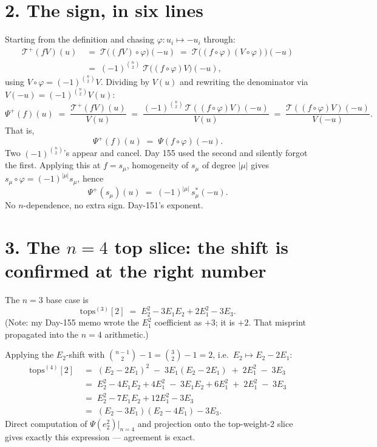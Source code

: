 \documentclass[11pt,a4paper]{article}
\newcommand{\Psip}{\Psi^{+}}
\newcommand{\Ts}{\mathcal{T}}
\newcommand{\Tp}{\mathcal{T}^{+}}
\begin{document}
\section*{2. The sign, in six lines}

Starting from the definition and chasing $\varphi\colon u_i\mapsto -u_i$ through:
\begin{align*}
\Tp(fV)(u) &\;=\; \Ts\!\bigl((fV)\circ\varphi\bigr)(-u)
  \;=\; \Ts\!\bigl((f\circ\varphi)(V\circ\varphi)\bigr)(-u)\\
&\;=\; (-1)^{\binom{n}{2}}\;\Ts\!\bigl((f\circ\varphi)V\bigr)(-u),
\end{align*}
using $V\circ\varphi = (-1)^{\binom{n}{2}} V$. Dividing by $V(u)$ and rewriting
the denominator via $V(-u) = (-1)^{\binom{n}{2}} V(u)$:
\[
\Psip(f)(u) \;=\; \frac{\Tp(fV)(u)}{V(u)}
\;=\;
\frac{(-1)^{\binom{n}{2}}\,\Ts((f\circ\varphi)V)(-u)}{V(u)}
\;=\;
\frac{\Ts((f\circ\varphi)V)(-u)}{V(-u)}.
\]
That is,
\[
\boxed{\ \Psip(f)(u) \;=\; \Psi(f\circ\varphi)(-u).\ }
\]
Two $(-1)^{\binom{n}{2}}$'s appear and cancel. Day 155 used the second and
silently forgot the first. Applying this at $f = s_\mu$, homogeneity of $s_\mu$
of degree $|\mu|$ gives $s_\mu\circ\varphi = (-1)^{|\mu|} s_\mu$, hence
\[
\Psip(s_\mu)(u) \;=\; (-1)^{|\mu|}\,s^*_\mu(-u).
\]
No $n$-dependence, no extra sign. Day-151's exponent.

\section*{3. The $n=4$ top slice: the shift is confirmed at the right number}

The $n=3$ base case is
\[
\mathrm{tops}^{(3)}[2] \;=\; E_2^2 - 3E_1E_2 + 2E_1^2 - 3E_3.
\]
(Note: my Day-155 memo wrote the $E_1^2$ coefficient as $+3$; it is $+2$. That
misprint propagated into the $n=4$ arithmetic.)

Applying the $E_2$-shift with $\binom{n-1}{2}-1 = \binom{3}{2}-1 = 2$, i.e.\
$E_2 \mapsto E_2 - 2E_1$:
\begin{align*}
\mathrm{tops}^{(4)}[2]
&\;=\; (E_2 - 2E_1)^2 \;-\; 3E_1(E_2 - 2E_1) \;+\; 2E_1^2 \;-\; 3E_3\\
&\;=\; E_2^2 - 4E_1E_2 + 4E_1^2 \;-\; 3E_1E_2 + 6E_1^2 \;+\; 2E_1^2 \;-\; 3E_3\\
&\;=\; E_2^2 - 7E_1E_2 + 12E_1^2 - 3E_3\\
&\;=\; (E_2 - 3E_1)(E_2 - 4E_1) - 3E_3.
\end{align*}
Direct computation of $\Psi(e_2^2)|_{n=4}$ and projection onto the
top-weight-$2$ slice gives exactly this expression --- agreement is exact.
\end{document}
